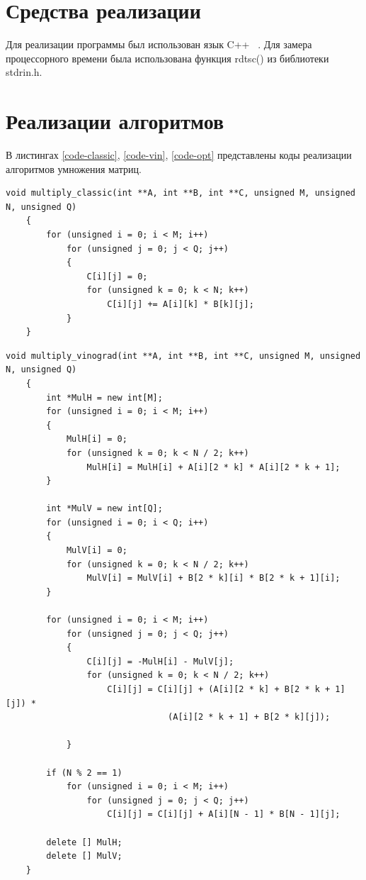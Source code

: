 \documentclass[12pt, a4paper]{report}
\begin{document}
	\section{Средства реализации}
	Для реализации программы был использован язык C++ ~\cite{CPP}. Для замера процессорного времени была использована функция rdtsc() из библиотеки stdrin.h.
	\section{Реализации алгоритмов}
	В листингах \ref{code-classic}, \ref{code-vin}, \ref{code-opt} представлены коды реализации алгоритмов умножения матриц.
	\begin{lstlisting}[label=code-classic,caption=Классический алгоритм]
	void multiply_classic(int **A, int **B, int **C, unsigned M, unsigned N, unsigned Q)
	{
		for (unsigned i = 0; i < M; i++)
			for (unsigned j = 0; j < Q; j++)
			{
				C[i][j] = 0;
				for (unsigned k = 0; k < N; k++)
					C[i][j] += A[i][k] * B[k][j];
			}
	}
	\end{lstlisting}

	\begin{lstlisting}[label=code-vin,caption=Алгоритм Винограда]
	void multiply_vinograd(int **A, int **B, int **C, unsigned M, unsigned N, unsigned Q)
	{
		int *MulH = new int[M];
		for (unsigned i = 0; i < M; i++)
		{
			MulH[i] = 0;
			for (unsigned k = 0; k < N / 2; k++)
				MulH[i] = MulH[i] + A[i][2 * k] * A[i][2 * k + 1];
		}
		
		int *MulV = new int[Q];
		for (unsigned i = 0; i < Q; i++)
		{
			MulV[i] = 0;
			for (unsigned k = 0; k < N / 2; k++)
				MulV[i] = MulV[i] + B[2 * k][i] * B[2 * k + 1][i];
		}
		
		for (unsigned i = 0; i < M; i++)
			for (unsigned j = 0; j < Q; j++)
			{
				C[i][j] = -MulH[i] - MulV[j];
				for (unsigned k = 0; k < N / 2; k++)
					C[i][j] = C[i][j] + (A[i][2 * k] + B[2 * k + 1][j]) *
								(A[i][2 * k + 1] + B[2 * k][j]);
			
			}
		
		if (N % 2 == 1)
			for (unsigned i = 0; i < M; i++)
				for (unsigned j = 0; j < Q; j++)
					C[i][j] = C[i][j] + A[i][N - 1] * B[N - 1][j];
		
		delete [] MulH;
		delete [] MulV;
	}
	\end{lstlisting}
\end{document}
